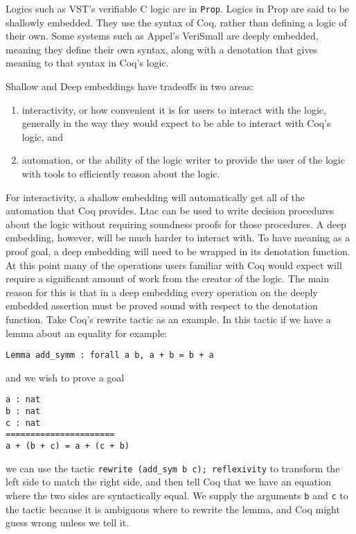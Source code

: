 \documentclass{puthesis}
\begin{document}
Logics such as VST's verifiable C logic are in
\lstinline|Prop|. Logics in Prop are said to be shallowly
embedded. They use the syntax of Coq, rather than defining a logic of
their own. Some systems such as Appel's VeriSmall \cite{} are deeply
embedded, meaning they define their own syntax, along with a
denotation that gives meaning to that syntax in Coq's logic. 

Shallow and Deep embeddings have tradeoffs in two areas:

\begin{enumerate}
\item interactivity, or how convenient it is for users to interact
  with the logic, generally in the way they would expect to be able to
  interact with Coq's logic, and
\item automation, or the ability of the logic writer to provide the
  user of the logic with tools to efficiently reason about the logic.
\end{enumerate}

For interactivity, a shallow embedding will automatically get all of
the automation that Coq provides. Ltac can be used to write decision
procedures about the logic without requiring soundness proofs for
those procedures. A deep embedding, however, will be much harder to
interact with. To have meaning as a proof goal, a deep embedding will
need to be wrapped in its denotation function. At this point many of
the operations users familiar with Coq would expect will require a
significant amount of work from the creator of the logic. The main
reason for this is that in a deep embedding every operation on the
deeply embedded assertion must be proved sound with respect to the
denotation function. Take Coq's rewrite tactic as an example. In this
tactic if we have a lemma about an equality for example:

\begin{lstlisting}
Lemma add_symm : forall a b, a + b = b + a
\end{lstlisting}

and we wish to prove a goal 

\begin{lstlisting}
a : nat
b : nat
c : nat
======================
a + (b + c) = a + (c + b) 
\end{lstlisting}

we can use the tactic \lstinline|rewrite (add_sym b c); reflexivity|
to transform the left side to match the right side, and then tell Coq
that we have an equation where the two sides are syntactically
equal. We supply the arguments \lstinline|b| and \lstinline|c| to the
tactic because it is ambiguous where to rewrite the lemma, and Coq
might guess wrong unless we tell it.
\end{document}
